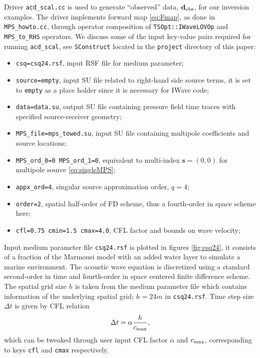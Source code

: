 Driver {\tt acd\_scal.cc} is used to generate ``observed'' data, $\mathbf d_{\rm obs}$, for our inversion examples.
The driver implements forward map \ref{eq:Fmap}, as done in {\tt MPS\_howto.cc}, through operator composition of {\tt TSOpt::IWaveLOVOp} and {\tt MPS\_to\_RHS} operators.
We discuss some of the input key-value pairs required for running {\tt acd\_scal}, see {\tt SConstruct} located in the {\tt project} directory of this paper:
\begin{itemize}
	\item {\tt csq=csq24.rsf}, input RSF file for medium parameter;
	\item {\tt source=empty}, input SU file related to right-hand side source terms, it is set to {\tt empty} as a place holder since it is necessary for IWave code;
	\item {\tt data=data.su}, output SU file containing pressure field time traces with specified source-receiver geometry;
	\item {\tt MPS\_file=mps\_towed.su}, input SU file containing multipole coefficients and source locations;
	\item {\tt MPS\_ord\_0=0 MPS\_ord\_1=0}, equivalent to multi-index $\mathbf s=(0,0)$ for multipole source \ref{eq:singleMPS};
	\item {\tt appx\_ord=4}, singular source approximation order, $q=4$;
	\item {\tt order=2}, spatial half-order of FD scheme, thus a fourth-order in space scheme here;
	\item {\tt cfl=0.75 cmin=1.5 cmax=4.0}, CFL factor and bounds on wave velocity;
\end{itemize}

Input medium parameter file {\tt csq24.rsf} is plotted in figures \ref{fig:csq24}, it consists of a fraction of the Marmousi model with an added water layer to simulate a marine environment.
The acoustic wave equation is discretized using a standard second-order in time and fourth-order in space centered finite difference scheme.
The spatial grid size $h$ is taken from the medium parameter file which contains information of the underlying spatial grid; $h=24m$ in {\tt csq24.rsf}.
Time step size $\Delta t$ is given by CFL relation
\[
	\Delta t = \alpha \frac{h}{c_{\rm max}},
\] 
which can be tweaked through user input CFL factor $\alpha$ and $c_{\rm max}$, corresponding to keys {\tt cfl} and {\tt  cmax} respectively.

